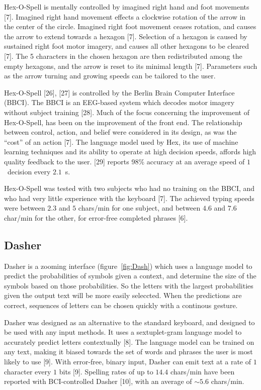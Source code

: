 \documentclass[12pt,titlepage]{article}
\begin{document}
Hex-O-Spell is mentally controlled by imagined right hand and foot movements [7].  Imagined right 
hand movement effects a clockwise rotation of the arrow in the center of the circle.  Imagined right foot 
movement ceases rotation, and causes the arrow to extend towards a hexagon [7].  Selection of a 
hexagon is caused by sustained right foot motor imagery, and causes all other hexagons to be 
cleared [7].  The 5 characters in the chosen hexagon are then redistributed among the empty hexagons, 
and the arrow is reset to its minimal length [7].  Parameters such as the arrow turning and growing 
speeds can be tailored to the user.

Hex-O-Spell [26], [27] is controlled by the Berlin Brain Computer Interface (BBCI).  The BBCI is an EEG-based
system which decodes motor imagery without subject training [28].  Much of the  focus 
concerning the improvement of Hex-O-Spell, has been on the improvement of the front end.  The 
relationship between control, action, and belief were considered in its design, as was the ``cost'' of an 
action [7].  The language model used by Hex,  its use of machine learning techniques and its ability to 
operate at high decision speeds, affords high quality feedback to the user. [29] reports 98\% accuracy at 
an average speed of $1$~decision every  $2.1$~s.

Hex-O-Spell was tested with two subjects who had no training on the BBCI, and who had very little 
experience with the keyboard [7].  The achieved typing speeds were between $2.3$ and $5$ chars/min for 
one subject, and between $4.6$ and $7.6$ char/min for the other, for error-free completed phrases [6].

\subsection{Dasher}

Dasher is a zooming interface (figure~\ref{fig:Dash}) which uses a language model to predict the probabilities of 
symbols given a context, and determine the size of the symbols based on those probabilities.  So the 
letters with the largest probabilities given the output text will be more easily seleccted.  When the 
predictions are correct, sequences of letters can be chosen quickly with a continous gesture.

Dasher was designed as an alternative to the standard keyboard, and designed to be used with any input 
methods.  It uses a sextuplet-gram language model to accurately predict letters contextually [8]. The 
language model can be trained on any text, making it biased towards the set of words and phrases the 
user is most likely to use [9].  With error-free, binary input, Dasher can emit text at a rate of $1$ character 
every $1$ bits [9].  Spelling rates of up to $14.4$ chars/min have been reported with BCI-controlled Dasher [10], 
with an average of $\sim5.6$ chars/min.
\end{document}
